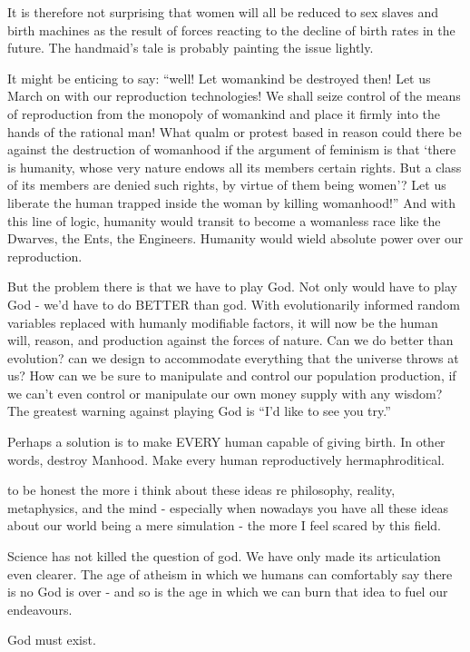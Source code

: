 It is therefore not surprising that women will all be reduced to sex slaves and birth machines as the result of forces reacting to the decline of birth rates in the future. The handmaid’s tale is probably painting the issue lightly. 

It might be enticing to say: “well! Let womankind be destroyed then! Let us March on with our reproduction technologies! We shall seize control of the means of reproduction from the monopoly of womankind and place it firmly into the hands of the rational man! What qualm or protest based in reason could there be against the destruction of womanhood if the argument of feminism is that ‘there is humanity, whose very nature endows all its members certain rights. But a class of its members are denied such rights, by virtue of them being women’? Let us liberate the human trapped inside the woman by killing womanhood!” And with this line of logic, humanity would transit to become a womanless race like the Dwarves, the Ents, the Engineers. Humanity would wield absolute power over our reproduction. 

But the problem there is that we have to play God. Not only would have to play God - we’d have to do BETTER than god. With evolutionarily informed random variables replaced with humanly modifiable factors, it will now be the human will, reason, and production against the forces of nature. Can we do better than evolution? can we design to accommodate everything that the universe throws at us? How can we be sure to manipulate and control our population production, if we can’t even control or manipulate our own money supply with any wisdom? The greatest warning against playing God is “I’d like to see you try.” 

Perhaps a solution is to make EVERY human capable of giving birth. In other words, destroy Manhood. Make every human reproductively hermaphroditical. 




to be honest the more i think about these ideas re philosophy, reality, metaphysics, and the mind - especially when nowadays you have all these ideas about our world being a mere simulation - the more I feel scared by this field.

Science has not killed the question of god. We have only made its articulation even clearer. The age of atheism in which we humans can comfortably say there is no God is over - and so is the age in which we can burn that idea to fuel our endeavours.


God must exist. 

